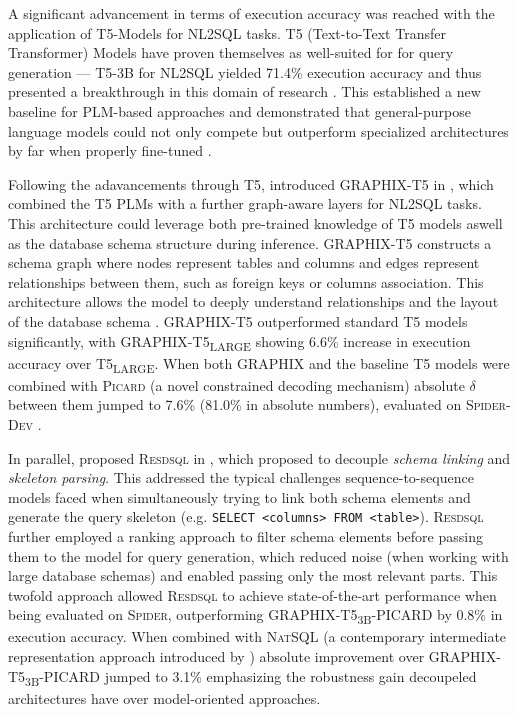 A significant advancement in terms of execution accuracy was reached with the application of T5-Models for NL2SQL tasks. T5
(Text-to-Text Transfer Transformer) Models have proven themselves as well-suited for for query generation — T5-3B for NL2SQL
yielded 71.4\% execution accuracy and thus presented a breakthrough in this domain of research \citep{T2SQL-LLM-Bench-3}.
This established a new baseline for PLM-based approaches and demonstrated that general-purpose language models could not
only compete but outperform specialized architectures by far when properly fine-tuned \citep{T2SQL-LLM-Bench-3}.

Following the adavancements through T5, \citeauthor*{GRAPHIX} introduced GRAPHIX-T5 in \citeyear{GRAPHIX}, which combined
the T5 PLMs with a further graph-aware layers for NL2SQL tasks. This architecture could leverage both pre-trained knowledge
of T5 models aswell as the database schema structure during inference. GRAPHIX-T5 constructs a schema graph where nodes
represent tables and columns and edges represent relationships between them, such as foreign keys or columns association.
This architecture allows the model to deeply understand relationships and the layout of the database schema \citep{GRAPHIX}. 
GRAPHIX-T5 outperformed standard T5 models significantly, with GRAPHIX-T5\textsubscript{\tiny{LARGE}} showing 6.6\% increase
in execution accuracy over T5\textsubscript{\tiny{LARGE}}. When both GRAPHIX and the baseline T5 models were combined with
\textsc{Picard} (a novel constrained decoding mechanism) absolute $\delta$ between them jumped to 7.6\% (81.0\% in absolute
numbers), evaluated on \textsc{Spider-Dev} \citep{GRAPHIX}.

In parallel, \citeauthor*{RESDSQL} proposed \textsc{Resdsql} in \citeyear{RESDSQL}, which proposed to decouple
\textit{schema linking} and \textit{skeleton parsing}. This addressed the typical challenges sequence-to-sequence models
faced when simultaneously trying to link both schema elements and generate the query skeleton (e.g. 
\texttt{SELECT <columns> FROM <table>}). \textsc{Resdsql} further employed a ranking approach to filter schema elements
before passing them to the model for query generation, which reduced noise (when working with large database schemas)
and enabled passing only the most relevant parts. This twofold approach allowed \textsc{Resdsql} to achieve state-of-the-art
performance when being evaluated on \textsc{Spider}, outperforming GRAPHIX-T5\textsubscript{\tiny{3B}}-PICARD by 0.8\% in
execution accuracy. When combined with \textsc{NatSQL} (a contemporary intermediate representation approach introduced
by \cite{NATSQL}) absolute improvement over GRAPHIX-T5\textsubscript{\tiny{3B}}-PICARD jumped to 3.1\% emphasizing the
robustness gain decoupeled architectures have over model-oriented approaches.

